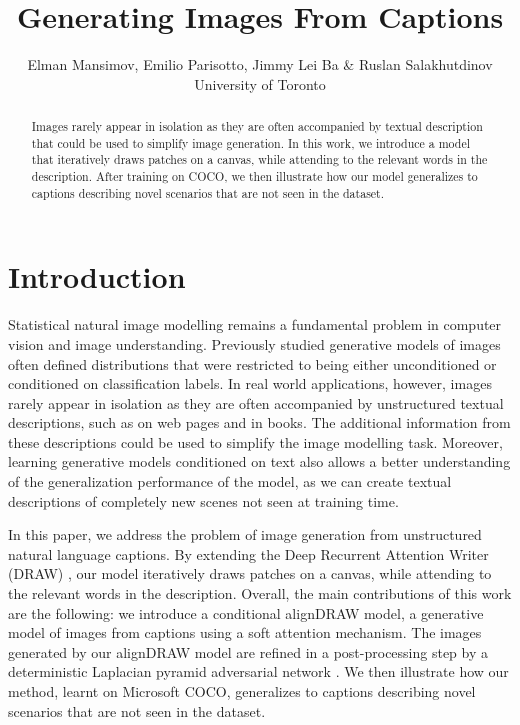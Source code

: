 \documentclass{article} %
\title{Generating Images From Captions}
\author{
Elman Mansimov, Emilio Parisotto, Jimmy Lei Ba \& Ruslan Salakhutdinov\\
University of Toronto\\
}
\newcommand{\comm}[1]{}
\begin{document}
\maketitle
\vspace*{-0.4cm}
\begin{abstract}
\vspace*{-0.15cm}
Images rarely appear in isolation as they are often accompanied by textual description that could be used to simplify image generation. In this work, we introduce a model that iteratively draws patches on a canvas, while attending to the relevant words in the description. After training on COCO, we then illustrate how our model generalizes to captions describing novel scenarios that are not seen in the dataset.
\end{abstract} 

\vspace{-0.1in}
\section{Introduction}
Statistical natural image modelling remains a fundamental problem in computer vision and image understanding.
Previously studied generative models of images often defined distributions that were restricted to being either unconditioned or conditioned on classification labels. In real world applications, however, images rarely appear in isolation as they are often accompanied by unstructured textual descriptions, such as on web pages and in books. 
The additional information from these descriptions could be used to simplify the image modelling task. Moreover, learning generative models conditioned on text also allows a better understanding of the generalization performance of the model, as we can create textual descriptions of completely new scenes not seen at training time. 

\comm{
Significant amount of recent works has been focused on generating captions from images \citep{karpathy_captions}, \citep{xu_captions}, \citep{kiros_captions} and etc. By contrast, image understanding may also be studied by generating images correctly interpreting the text description. 
Generating high dimensional realistic images from their descriptions is a more difficult approach that combines two challenging components of language modelling and image generation.  
}

In this paper, we address the problem of image generation from unstructured natural language captions. By extending the Deep Recurrent Attention Writer (DRAW) \cite{gregor_draw}, our model iteratively draws patches on a canvas, while attending to the relevant words in the description. Overall, the main contributions of this work are the following: we introduce a conditional alignDRAW model, a generative model of images from captions using a soft attention mechanism. The images generated by our alignDRAW model are refined in a post-processing step by a deterministic Laplacian pyramid adversarial network \cite{denton_lapgan}. We then illustrate how our method, learnt on Microsoft COCO, generalizes to captions describing novel scenarios that are not seen in the dataset. 
\end{document}
